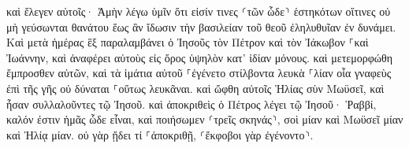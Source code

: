 \documentclass{openreader}
\begin{document}
καὶ ἔλεγεν αὐτοῖς· Ἀμὴν λέγω ὑμῖν ὅτι εἰσίν τινες ⸂τῶν ὧδε⸃ ἑστηκότων οἵτινες οὐ μὴ γεύσωνται θανάτου ἕως ἂν ἴδωσιν τὴν βασιλείαν τοῦ θεοῦ ἐληλυθυῖαν ἐν δυνάμει. 
Καὶ μετὰ ἡμέρας ἓξ παραλαμβάνει ὁ Ἰησοῦς τὸν Πέτρον καὶ τὸν Ἰάκωβον ⸀καὶ Ἰωάννην, καὶ ἀναφέρει αὐτοὺς εἰς ὄρος ὑψηλὸν κατ’ ἰδίαν μόνους. καὶ μετεμορφώθη ἔμπροσθεν αὐτῶν, 
καὶ τὰ ἱμάτια αὐτοῦ ⸀ἐγένετο στίλβοντα λευκὰ ⸀λίαν οἷα γναφεὺς ἐπὶ τῆς γῆς οὐ δύναται ⸀οὕτως λευκᾶναι. 
καὶ ὤφθη αὐτοῖς Ἠλίας σὺν Μωϋσεῖ, καὶ ἦσαν συλλαλοῦντες τῷ Ἰησοῦ. 
καὶ ἀποκριθεὶς ὁ Πέτρος λέγει τῷ Ἰησοῦ· Ῥαββί, καλόν ἐστιν ἡμᾶς ὧδε εἶναι, καὶ ποιήσωμεν ⸂τρεῖς σκηνάς⸃, σοὶ μίαν καὶ Μωϋσεῖ μίαν καὶ Ἠλίᾳ μίαν. 
οὐ γὰρ ᾔδει τί ⸀ἀποκριθῇ, ⸂ἔκφοβοι γὰρ ἐγένοντο⸃. 
\end{document}
